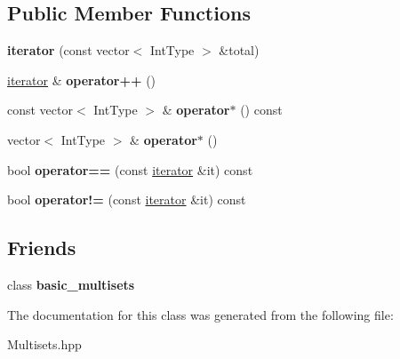 \subsection*{Public Member Functions}
\begin{DoxyCompactItemize}
\item 
\hypertarget{classdscr_1_1basic__multisets_1_1iterator_a8593f477dc6ea42b78dc7a09ca8780af}{{\bfseries iterator} (const vector$<$ Int\-Type $>$ \&total)}\label{classdscr_1_1basic__multisets_1_1iterator_a8593f477dc6ea42b78dc7a09ca8780af}

\item 
\hypertarget{classdscr_1_1basic__multisets_1_1iterator_ab8efc236871cafe7ecabc93f62efaee4}{\hyperlink{classdscr_1_1basic__multisets_1_1iterator}{iterator} \& {\bfseries operator++} ()}\label{classdscr_1_1basic__multisets_1_1iterator_ab8efc236871cafe7ecabc93f62efaee4}

\item 
\hypertarget{classdscr_1_1basic__multisets_1_1iterator_a0951c43ba6d231de238c47a421889879}{const vector$<$ Int\-Type $>$ \& {\bfseries operator$\ast$} () const }\label{classdscr_1_1basic__multisets_1_1iterator_a0951c43ba6d231de238c47a421889879}

\item 
\hypertarget{classdscr_1_1basic__multisets_1_1iterator_a25922f0c1bfee770223acda648277174}{vector$<$ Int\-Type $>$ \& {\bfseries operator$\ast$} ()}\label{classdscr_1_1basic__multisets_1_1iterator_a25922f0c1bfee770223acda648277174}

\item 
\hypertarget{classdscr_1_1basic__multisets_1_1iterator_a4198bdfea6b080c891581363097f0513}{bool {\bfseries operator==} (const \hyperlink{classdscr_1_1basic__multisets_1_1iterator}{iterator} \&it) const }\label{classdscr_1_1basic__multisets_1_1iterator_a4198bdfea6b080c891581363097f0513}

\item 
\hypertarget{classdscr_1_1basic__multisets_1_1iterator_a66da6fbeba7a333b4160472bb3f90046}{bool {\bfseries operator!=} (const \hyperlink{classdscr_1_1basic__multisets_1_1iterator}{iterator} \&it) const }\label{classdscr_1_1basic__multisets_1_1iterator_a66da6fbeba7a333b4160472bb3f90046}

\end{DoxyCompactItemize}
\subsection*{Friends}
\begin{DoxyCompactItemize}
\item 
\hypertarget{classdscr_1_1basic__multisets_1_1iterator_a92dc798fe1da23a96a2138fadd200c4a}{class {\bfseries basic\-\_\-multisets}}\label{classdscr_1_1basic__multisets_1_1iterator_a92dc798fe1da23a96a2138fadd200c4a}

\end{DoxyCompactItemize}


The documentation for this class was generated from the following file\-:\begin{DoxyCompactItemize}
\item 
Multisets.\-hpp\end{DoxyCompactItemize}
